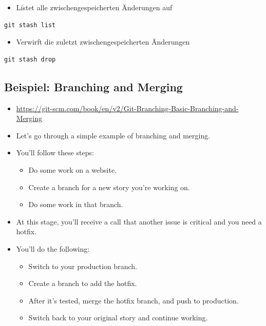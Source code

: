 \documentclass[11pt]{article}
\begin{document}
\begin{itemize}
\item Listet alle zwischengespeicherten Änderungen auf
\end{itemize}
\begin{verbatim}
git stash list
\end{verbatim}

\begin{itemize}
\item Verwirft die zuletzt zwischengespeicherten Änderungen
\end{itemize}
\begin{verbatim}
git stash drop
\end{verbatim}

\subsection{Beispiel: Branching and Merging}
\label{sec:orga77eb02}

\begin{itemize}
\item \url{https://git-scm.com/book/en/v2/Git-Branching-Basic-Branching-and-Merging}

\item Let’s go through a simple example of branching and merging.
\item You’ll follow these steps:
\begin{itemize}
\item Do some work on a website.
\item Create a branch for a new story you’re working on.
\item Do some work in that branch.
\end{itemize}

\item At this stage, you’ll receive a call that another issue is critical and you need a hotfix.
\item You’ll do the following:
\begin{itemize}
\item Switch to your production branch.
\item Create a branch to add the hotfix.
\item After it’s tested, merge the hotfix branch, and push to production.
\item Switch back to your original story and continue working.
\end{itemize}
\end{itemize}
\end{document}
